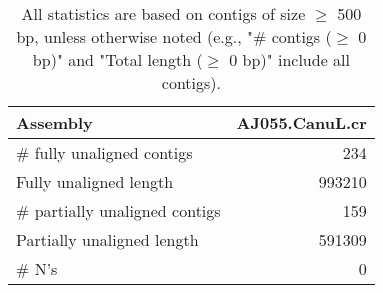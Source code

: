 \documentclass[12pt,a4paper]{article}
\begin{document}
\begin{table}[ht]
\begin{center}
\caption{All statistics are based on contigs of size $\geq$ 500 bp, unless otherwise noted (e.g., "\# contigs ($\geq$ 0 bp)" and "Total length ($\geq$ 0 bp)" include all contigs).}
\begin{tabular}{|l*{1}{|r}|}
\hline
Assembly & AJ055.CanuL.cr \\ \hline
\# fully unaligned contigs & 234 \\ \hline
Fully unaligned length & 993210 \\ \hline
\# partially unaligned contigs & 159 \\ \hline
Partially unaligned length & 591309 \\ \hline
\# N's & 0 \\ \hline
\end{tabular}
\end{center}
\end{table}
\end{document}
